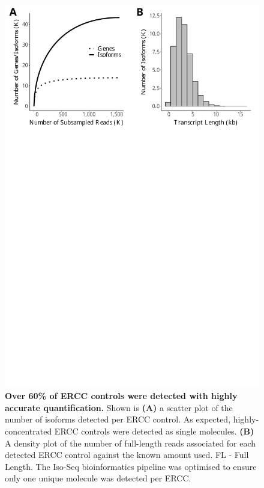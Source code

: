 \begin{figure}[htp]
	\begin{center}
		\includegraphics[page=3,trim={0 26cm 0 0},clip,scale = 0.55]{Figures/IsoSeqWholeTranscriptome.pdf}
	\end{center}
	\captionsetup{width=0.95\textwidth}
	\caption[Detection of ERCC controls from global transcriptome profiling]%
	{\textbf{Over 60\% of ERCC controls were detected with highly accurate quantification.} Shown is \textbf{(A)} a scatter plot of the number of isoforms detected per ERCC control. As expected,  highly-concentrated ERCC controls were detected as single molecules. \textbf{(B)} A density plot of the number of full-length reads associated for each detected ERCC control against the known amount used. FL - Full Length. The Iso-Seq bioinformatics pipeline was optimised to ensure only one unique molecule was detected per ERCC.}
	\label{fig:isoseq_whole_ercc}
\end{figure}

